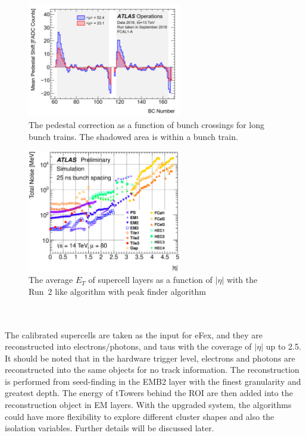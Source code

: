 \begin{figure}[!h]                
  	\includegraphics[width=0.6\textwidth]{Chapter6/pedestalCorr.png}
  	\begin{center}
  		\caption{The pedestal correction as a function of bunch crossings for long bunch trains. The shadowed area is within a bunch train\cite{Jongmanns:2661780}.}
  		\label{Fig:pc}            
  	\end{center}
\end{figure}
\begin{figure}[!h]                
	\includegraphics[width=0.6\textwidth]{Chapter6/noise_tot_plot_OFLCOND-MC12-HPS-19-60-25.eps}
	\caption{The average $E_{T}$ of supercell layers as a function of $|\eta|$ with the Run~2 like algorithm with peak finder algorithm\cite{Aleksa:1602230}}
	\label{Fig:sc_noise}            
\end{figure}
\noindent
\\
\\The calibrated supercells are taken as the input for eFex, and they are reconstructed into electrons/photons, and taus with the coverage of $|\eta|$ up to 2.5. It should be noted that in the hardware trigger level, electrons and photons are reconstructed into the same objects for no track information. The reconstruction is performed from seed-finding in the EMB2 layer with the finest granularity and greatest depth. The energy of tTowers behind the ROI are then added into the reconstruction object in EM layers. With the upgraded system, the algorithms could have more flexibility to explore different cluster shapes and also the isolation variables. Further details will be discussed later. 
